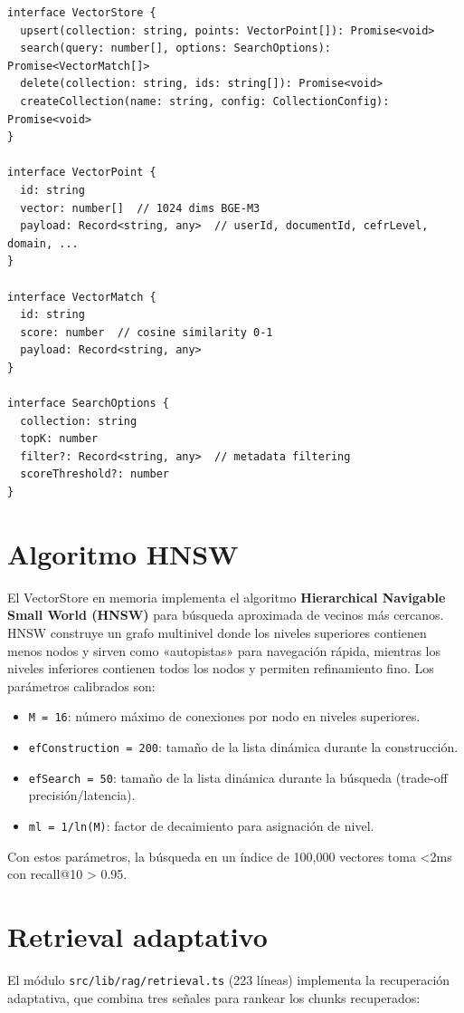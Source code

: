 \documentclass[10pt,a4paper,oneside]{report}
\begin{document}
\begin{lstlisting}[style=ts,caption={Interfaz VectorStore}]
interface VectorStore {
  upsert(collection: string, points: VectorPoint[]): Promise<void>
  search(query: number[], options: SearchOptions): Promise<VectorMatch[]>
  delete(collection: string, ids: string[]): Promise<void>
  createCollection(name: string, config: CollectionConfig): Promise<void>
}

interface VectorPoint {
  id: string
  vector: number[]  // 1024 dims BGE-M3
  payload: Record<string, any>  // userId, documentId, cefrLevel, domain, ...
}

interface VectorMatch {
  id: string
  score: number  // cosine similarity 0-1
  payload: Record<string, any>
}

interface SearchOptions {
  collection: string
  topK: number
  filter?: Record<string, any>  // metadata filtering
  scoreThreshold?: number
}
\end{lstlisting}

\section{Algoritmo HNSW}
El VectorStore en memoria implementa el algoritmo \textbf{Hierarchical Navigable Small World (HNSW)} para búsqueda aproximada de vecinos más cercanos. HNSW construye un grafo multinivel donde los niveles superiores contienen menos nodos y sirven como «autopistas» para navegación rápida, mientras los niveles inferiores contienen todos los nodos y permiten refinamiento fino. Los parámetros calibrados son:

\begin{itemize}[leftmargin=1.4em]
\item \texttt{M = 16}: número máximo de conexiones por nodo en niveles superiores.
\item \texttt{efConstruction = 200}: tamaño de la lista dinámica durante la construcción.
\item \texttt{efSearch = 50}: tamaño de la lista dinámica durante la búsqueda (trade-off precisión/latencia).
\item \texttt{ml = 1/ln(M)}: factor de decaimiento para asignación de nivel.
\end{itemize}

Con estos parámetros, la búsqueda en un índice de 100,000 vectores toma <2ms con recall@10 > 0.95.

\section{Retrieval adaptativo}
El módulo \texttt{src/lib/rag/retrieval.ts} (223 líneas) implementa la recuperación adaptativa, que combina tres señales para rankear los chunks recuperados:
\end{document}
